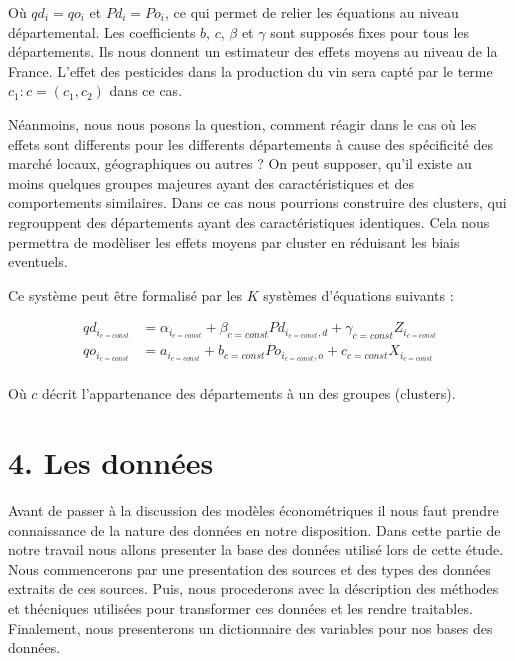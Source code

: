 \documentclass[11pt,]{article}
\begin{document}
Où \(qd_i = qo_i\) et \(Pd_i = Po_i\), ce qui permet de relier les
équations au niveau départemental. Les coefficients \(b\), \(c\),
\(\beta\) et \(\gamma\) sont supposés fixes pour tous les départements.
Ils nous donnent un estimateur des effets moyens au niveau de la France.
L'effet des pesticides dans la production du vin sera capté par le terme
\(c_{1} : c = (c_{1}, c_{2})\) dans ce cas.

Néanmoins, nous nous posons la question, comment réagir dans le cas où
les effets sont differents pour les differents départements à cause des
spécificité des marché locaux, géographiques ou autres ? On peut
supposer, qu'il existe au moins quelques groupes majeures ayant des
caractéristiques et des comportements similaires. Dans ce cas nous
pourrions construire des clusters, qui regrouppent des départements
ayant des caractéristiques identiques. Cela nous permettra de modèliser
les effets moyens par cluster en réduisant les biais eventuels.

Ce système peut être formalisé par les \(K\) systèmes d'équations
suivants :

\begin{align*}
  qd_{i_{c = const}} & = \alpha_{i_{c = const}} + \beta_{c = const} Pd_{i_{c = const},d} + \gamma_{c = const} Z_{i_{c = const}} \\
  qo_{i_{c = const}} & = a_{i_{c = const}} + b_{c = const} Po_{i_{c = const},o} + c_{c = const} X_{i_{c = const}} \\ 
\end{align*}

Où \(c\) décrit l'appartenance des départements à un des groupes
(clusters).

\hypertarget{les-donnees}{%
\section{4. Les données}\label{les-donnees}}

Avant de passer à la discussion des modèles économétriques il nous faut
prendre connaissance de la nature des données en notre disposition. Dans
cette partie de notre travail nous allons presenter la base des données
utilisé lors de cette étude. Nous commencerons par une presentation des
sources et des types des données extraits de ces sources. Puis, nous
procederons avec la déscription des méthodes et thécniques utilisées
pour transformer ces données et les rendre traitables. Finalement, nous
presenterons un dictionnaire des variables pour nos bases des données.
\end{document}
